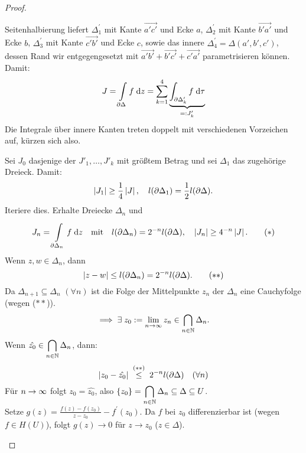 \documentclass[a4paper,twoside,DIV15,BCOR12mm]{scrbook}
\begin{document}
\begin{proof}
\begin{enumerate}[label=(\arabic*),ref=(\arabic*)]
\begin{center}
\begin{tikzpicture}[scale=3]
\end{tikzpicture}
\end{center}

Seitenhalbierung liefert $\Delta_1^\prime$ mit Kante $\overrightarrow{a' c'}$ und Ecke $a$, $\Delta_2^\prime$ mit Kante $\overrightarrow{b' a'}$ und Ecke $b$, $\Delta_3^\prime$ mit Kante $\overrightarrow{c' b'}$ und Ecke $c$, sowie das innere $\Delta_4^\prime = \Delta(a',b',c')$, dessen Rand wir entgegengesetzt mit $\overrightarrow{a'b'} + \overrightarrow{b'c'}+\overrightarrow{c' a'}$ parametrisieren können. Damit:
\[J=\Integral{\partial\Delta}{}{f}{z} = \sum_{k=1}^4\underbrace{\integral{\partial\Delta'_k}{}{f}{\tau}}_{\ad J'_k}\]
Die Integrale über innere Kanten treten doppelt mit verschiedenen Vorzeichen auf, kürzen sich also.

Sei $J_0$ dasjenige der $J'_1,\dotsc,J'_k$ mit größtem Betrag und sei $\Delta_1$ das zugehörige Dreieck. Damit:
\[\abs{J_1}\geq\frac{1}{4}\abs{J},\quad l(\partial\Delta_1)=\frac{1}{2}l(\partial\Delta).\]
Iteriere dies. Erhalte Dreiecke $\Delta_n$ und
\[J_n = \Integral{\partial\Delta_n}{}{f}{z}\quad\text{mit}\quad l(\partial\Delta_n)=2^{-n}l(\partial\Delta),\quad\abs{J_n}\geq 4^{-n}\abs{J}.\tag{$*$}\]
Wenn $z,w\in\Delta_n$, dann
\[\abs{z-w}\leq l(\partial\Delta_n) = 2^{-n}l(\partial\Delta).\tag{$**$}\]
Da $\Delta_{n+1}\subseteq \Delta_n$ $(\forall n)$ ist die Folge der Mittelpunkte $z_n$ der $\Delta_n$ eine Cauchyfolge (wegen ($**$)).
\[\folgt\exists\; z_0\da \lim_{n\ra\infty}z_n\in\bigcap_{\nat{n}}\Delta_n.\]
Wenn $\displaystyle \hat{z_0}\in\bigcap_{\nat{n}}\Delta_n$, dann:
\[\abs{z_0-\hat{z_0}}\wegen{\leq}{(**)}2^{-n}l(\partial\Delta)\quad(\forall n)\]
Für $n\ra\infty$ folgt $z_0 = \hat{z_0}$, also $\displaystyle\{z_0\}=\bigcap_{\nat{n}}\Delta_n\subseteq\Delta\subseteq U$.\\
Setze $\displaystyle g(z)=\frac{f(z)-f(z_0)}{z-z_0}-f^\prime(z_0)$. Da $f$ bei $z_0$ differenzierbar ist (wegen $f\in H(U)$),
folgt $g(z)\to0$ für $z\to z_0$ ($z\in\Delta$).


\end{enumerate}
\end{proof}
\end{document}
